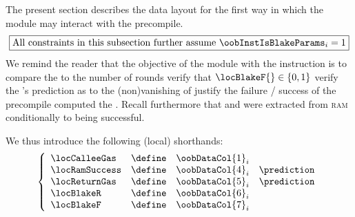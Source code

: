 The present section describes the data layout for the first way in which the \oobMod{} module may interact with the  precompile.
\[
	\boxed{\text{All constraints in this subsection further assume } \oobInstIsBlakeParams_{i} = 1 }
\]
We remind the reader that the objective of the \oobMod{} module with the \oobInstBlakeParams{} instruction is to
 compare the \locCalleeGas{} to the number of rounds \locBlakeR{}
 verify that $\locBlakeF{} \in \{0, 1\}$
 verify the \hubMod{}'s prediction as to the (non)vanishing of \locRac{}
 justify the failure / success of the precompile
 computed the \locRemainingGas{}.
Recall furthermore that \locBlakeR{} and \locBlakeF{} were extracted from \textsc{ram} conditionally to
\oobInstBlakeCds{} being successful.

We thus introduce the following (local) shorthands:
\[
	\left\{ \begin{array}{lclr}
		\locCalleeGas    & \define & \oobDataCol {1} _{i}               \\
		\locRamSuccess & \define & \oobDataCol {4} _{i} & \prediction \\
		\locReturnGas  & \define & \oobDataCol {5} _{i} & \prediction \\
		\locBlakeR     & \define & \oobDataCol {6} _{i}               \\
		\locBlakeF     & \define & \oobDataCol {7} _{i}               \\
	\end{array} \right.
\]

